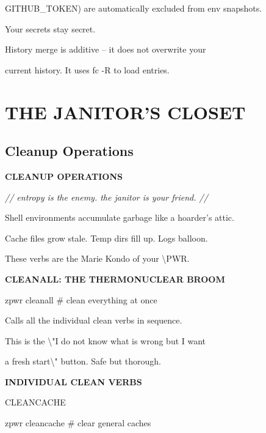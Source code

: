 \documentclass[11pt,a4paper,twoside]{book}
\begin{document}
GITHUB\_TOKEN) are automatically excluded from env snapshots.

Your secrets stay secret.

History merge is additive -- it does not overwrite your

current history. It uses fc -R to load entries.


\vspace{16pt}


\chapter{THE JANITOR'S CLOSET}

\section{Cleanup Operations}


\vspace{10pt}
{\large\bfseries\color{neoncyan} CLEANUP OPERATIONS}\vspace{6pt}

{\small\itshape\color{dimtext} // entropy is the enemy. the janitor is your friend. //}

Shell environments accumulate garbage like a hoarder's attic.

Cache files grow stale. Temp dirs fill up. Logs balloon.

These verbs are the Marie Kondo of your \textbackslash{}PWR.


\vspace{12pt}
{\bfseries\color{neonyellow} CLEANALL: THE THERMONUCLEAR BROOM}\vspace{4pt}

\begin{codebox}
zpwr cleanall                       \# clean everything at once\\
\end{codebox}

Calls all the individual clean verbs in sequence.

This is the \textbackslash{}"I do not know what is wrong but I want

a fresh start\textbackslash{}" button. Safe but thorough.


\vspace{12pt}
{\bfseries\color{neonyellow} INDIVIDUAL CLEAN VERBS}\vspace{4pt}

CLEANCACHE

\begin{codebox}
zpwr cleancache                     \# clear general caches\\
\end{codebox}
\end{document}

